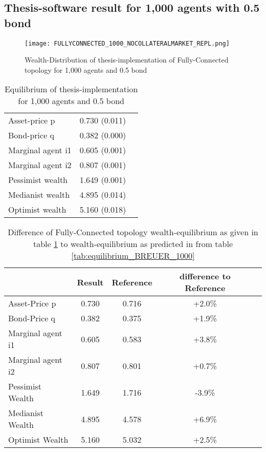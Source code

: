 \documentclass[Bachelorarbeit.tex]{subfiles}
\begin{document}
\subsection{Thesis-software result for 1,000 agents with 0.5 bond}
\begin{figure}[H]
	\centering
  \texttt{[image: FULLYCONNECTED\_1000\_NOCOLLATERALMARKET\_REPL.png]}
	\caption{Wealth-Distribution of thesis-implementation of Fully-Connected topology for 1,000 agents and 0.5 bond}
	\label{fig:wealth_FULLYCONNECTED_1000_NOCOLLATERALMARKET_REPL}
\end{figure}

\begin{table}[H]
	\centering
	\caption{Equilibrium of thesis-implementation for 1,000 agents and 0.5 bond}
	\begin{tabular} { l c r }
		\hline
		Asset-price p & 0.730 (0.011) \\
		Bond-price q & 0.382 (0.000) \\
		Marginal agent i1 & 0.605 (0.001) \\
		Marginal agent i2 & 0.807 (0.001) \\
		\hline
		Pessimist wealth & 1.649 (0.001) \\
		Medianist wealth & 4.895 (0.014) \\
		Optimist wealth & 5.160 (0.018) \\
		\hline
	\end{tabular}
	\label{tab:equilibrium_THESIS_1000_50_REPL}
\end{table}

\begin{table}[H]
	\caption{Difference of Fully-Connected topology wealth-equilibrium as given in table \ref{tab:equilibrium_THESIS_1000_50_REPL} to wealth-equilibrium as predicted in \cite{Breuer2015} from table \ref{tab:equilibrium_BREUER_1000}}
	\centering
	\begin{tabular} { l c c c r }
		& Result & Reference & difference to Reference \\
		\hline
		Asset-Price p & 0.730 & 0.716 & +2.0\% \\
		Bond-Price q & 0.382 & 0.375 & +1.9\% \\
		Marginal agent i1 & 0.605  & 0.583 & +3.8\% \\
		Marginal agent i2 & 0.807 & 0.801 & +0.7\% \\
		\hline
		Pessimist Wealth  & 1.649 & 1.716 & -3.9\% \\
		Medianist Wealth & 4.895 & 4.578 & +6.9\% \\
		Optimist Wealth & 5.160 & 5.032 & +2.5\% \\
		\hline
	\end{tabular}
\end{table} 
\end{document}
